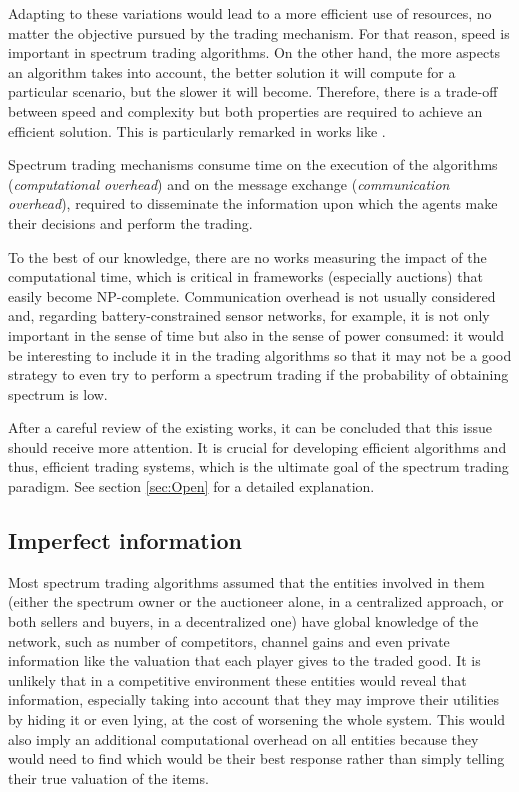 Adapting to these variations would lead to a more efficient use of resources, no matter the objective pursued by the trading mechanism. For that reason, speed is important in spectrum trading algorithms. On the other hand, the more aspects an algorithm takes into account, the better solution it will compute for a particular scenario, but the slower it will become. Therefore, there is a trade-off between speed and complexity but both properties are required to achieve an efficient solution. This is particularly remarked in works like \cite{ref:Zhou2008,ref:Gandhi2008}.

Spectrum trading mechanisms consume time on the execution of the algorithms (\textit{computational overhead}) and on the message exchange (\textit{communication overhead}), required to disseminate the information upon which the agents make their decisions and perform the trading. 

To the best of our knowledge, there are no works measuring the impact of the computational time, which is critical in frameworks (especially auctions) that easily become NP-complete. 
Communication overhead is not usually considered \cite{ref:Xu2010,ref:Niyato2008_Mark} and, regarding battery-constrained sensor networks, for example, it is not only important in the sense of time but also in the sense of power consumed: it would be interesting to include it in the trading algorithms so that it may not be a good strategy to even try to perform a spectrum trading if the probability of obtaining spectrum is low. 

After a careful review of the existing works, it can be concluded that this issue should receive more attention. It is crucial for developing efficient algorithms and thus, efficient trading systems, which is the ultimate goal of the spectrum trading paradigm. See section \ref{sec:Open} for a detailed explanation. 

\subsection{Imperfect information}
\label{subsec:Imperfect}
Most spectrum trading algorithms assumed that the entities involved in them (either the spectrum owner or the auctioneer alone, in a centralized approach, or both sellers and buyers, in a decentralized one) have global knowledge of the network, such as number of competitors, channel gains and even private information like the valuation that each player gives to the traded good. It is unlikely that in a competitive environment these entities would reveal that information, especially taking into account that they may improve their utilities by hiding it or even lying, at the cost of worsening the whole system. This would also imply an additional computational overhead on all entities because they would need to find which would be their best response rather than simply telling their true valuation of the items.


